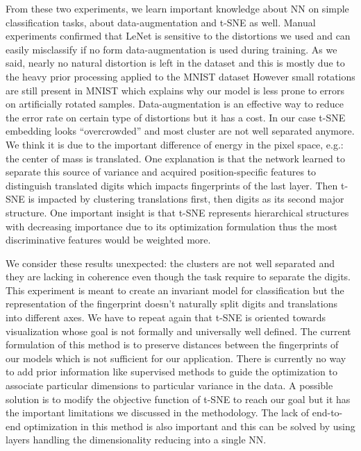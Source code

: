 \documentclass[a4paper,12pt]{report}
\newcommand{\eg}{e.g.}
\begin{document}
From these two experiments, we learn important knowledge about NN on simple classification tasks, about data-augmentation and t-SNE as well.
Manual experiments confirmed that LeNet is sensitive to the distortions we used and can easily misclassify if no form data-augmentation is used during training.
As we said, nearly no natural distortion is left in the dataset and this is mostly due to the heavy prior processing applied to the MNIST dataset
However small rotations are still present in MNIST which explains why our model is less prone to errors on artificially rotated samples.
Data-augmentation is an effective way to reduce the error rate on certain type of distortions but it has a cost.
In our case t-SNE embedding looks ``overcrowded'' and most cluster are not well separated anymore.
We think it is due to the important difference of energy in the pixel space, \eg: the center of mass is translated.
One explanation is that the network learned to separate this source of variance and acquired position-specific features to distinguish translated digits which impacts fingerprints of the last layer.
Then t-SNE is impacted by clustering translations first, then digits as its second major structure.
One important insight is that t-SNE represents hierarchical structures with decreasing importance due to its optimization formulation thus the most discriminative features would be weighted more.

We consider these results unexpected: the clusters are not well separated and they are lacking in coherence even though the task require to separate the digits.
This experiment is meant to create an invariant model for classification but the representation of the fingerprint doesn't naturally split digits and translations into different axes.
We have to repeat again that t-SNE is oriented towards visualization whose goal is not formally and universally well defined.
The current formulation of this method is to preserve distances between the fingerprints of our models which is not sufficient for our application.
There is currently no way to add prior information like supervised methods to guide the optimization to associate particular dimensions to particular variance in the data.
A possible solution is to modify the objective function of t-SNE to reach our goal but it has the important limitations we discussed in the methodology.
The lack of end-to-end optimization in this method is also important and this can be solved by using layers handling the dimensionality reducing into a single NN.
\end{document}
